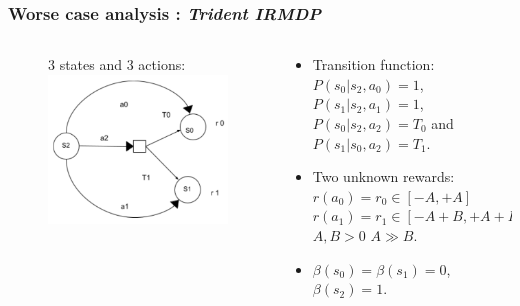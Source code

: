 \documentclass{beamer}
\begin{document}
\begin{frame}
\frametitle{Worse case analysis : \textit{Trident IRMDP}}

\begin{columns}
\begin{column}{0.49\textwidth}


\begin{figure}[]
	\begin{center}
$3$ states and $3$ actions:\\
    \includegraphics[scale=0.4]{images/Trident_MDP.pdf}
	\end{center}
\end{figure}


\end{column}

\begin{column}{0.5\textwidth}

\begin{itemize}
\item Transition function:\\
$P(s_0 | s_2,a_0)=1$, $P(s_1 |s_2 ,a_1)=1$, $P(s_0 | s_2, a_2) = T_0$ and $P(s_1 | s_0, a_2) = T_1$.
\item Two unknown rewards:\\
 $r(a_0)= r_0 \in [-A,+A]$  $r(a_1)= r_1 \in [-A+B,+A+B]$\\
 $A,B > 0$  $A \gg B$.\\
\item $\beta(s_0)= \beta(s_1) = 0$, $\beta(s_2)=1$.


\end{itemize}
\end{column}
\end{columns}
\end{frame}
\end{document}
